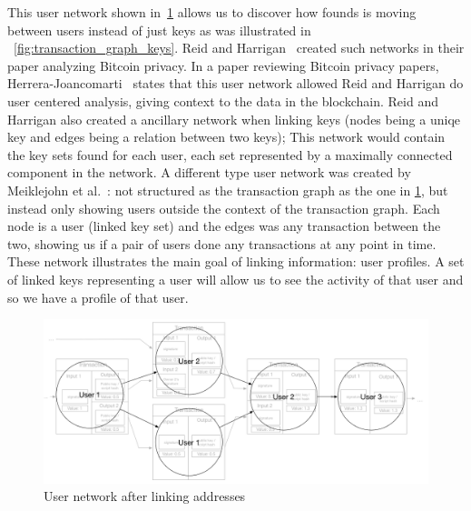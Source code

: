 This user network shown in~\cref{fig:user_graph} allows us to discover how founds is moving between users instead of just keys as was illustrated in ~\cref{fig:transaction_graph_keys}. Reid and Harrigan~\cite{reid2013analysis} created such networks in their paper analyzing Bitcoin privacy. In a paper reviewing Bitcoin privacy papers, Herrera-Joancomarti~\cite{herrera2015research} states that this user network allowed Reid and Harrigan do user centered analysis, giving context to the data in the blockchain. Reid and Harrigan also created a ancillary network when linking keys (nodes being a uniqe key and edges being a relation between two keys); This network would contain the key sets found for each user, each set represented by a maximally connected component in the network. A different type user network was created by Meiklejohn et al.~\cite{meiklejohn2013fistful}: not structured as the transaction graph as the one in \cref{fig:user_graph}, but instead only showing users outside the context of the transaction graph. Each node is a user (linked key set) and the edges was any transaction between the two, showing us if a pair of users done any transactions at any point in time. These network illustrates the main goal of linking information: user profiles. A set of linked keys representing a user will allow us to see the activity of that user and so we have a profile of that user.\\
 
\begin{figure}[ht]
    \centering
    \includegraphics[width=14cm]{figures/usernetwork_related.png}
    \caption{ User network after linking addresses}
    \label{fig:user_graph}
\end{figure}

